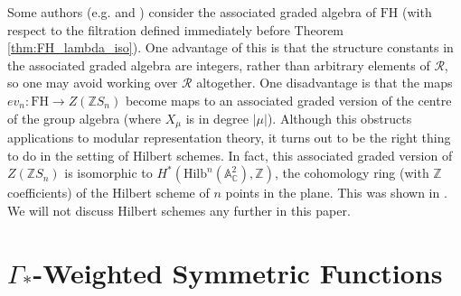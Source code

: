 \documentclass[ALCO,Unicode]{cedram}
\newcommand{\FH}{\mathrm{FH}}
\newcommand{\FH}{\mathrm{FH}}
\begin{document}
\begin{remark}
Some authors (e.g. \cite{Wang1} and \cite[Example 25, Section 1.7]{Macdonald}) consider the associated graded algebra of $\FH$ (with respect to the filtration defined immediately before Theorem \ref{thm:FH_lambda_iso}). One advantage of this is that the structure constants in the associated graded algebra are integers, rather than arbitrary elements of $\mathcal{R}$, so one may avoid working over $\mathcal{R}$ altogether. One disadvantage is that the maps $ev_n: \FH \to Z(\mathbb{Z}S_n)$ become maps to an associated graded version of the centre of the group algebra (where $X_\mu$ is in degree $|\mu|$). Although this obstructs applications to modular representation theory, it turns out to be the right thing to do in the setting of Hilbert schemes. In fact, this associated graded version of $Z(\mathbb{Z}S_n)$ is isomorphic to $H^*(\mathrm{Hilb}^n(\mathbb{A}_{\mathbb{C}}^2), \mathbb{Z})$, the cohomology ring (with $\mathbb{Z}$ coefficients) of the Hilbert scheme of $n$ points in the plane. This was shown in \cite{LehnSorger}. We will not discuss Hilbert schemes any further in this paper.
\end{remark}




\section{\texorpdfstring{$\Gamma_*$}{Gamma}-Weighted Symmetric Functions} \label{LambdaG_section}
\end{document}
